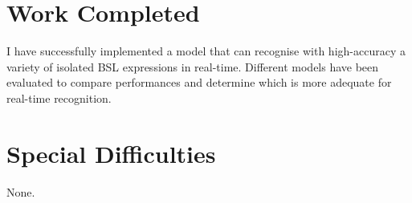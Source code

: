 \documentclass[final,rdr32.tex]{subfiles}
\begin{document}
\section*{Work Completed}


I have successfully implemented a model that can recognise with high-accuracy a variety of isolated BSL expressions in real-time. Different models have been evaluated to compare performances and determine which is more adequate for real-time recognition.

\section*{Special Difficulties}

None.
\end{document}
